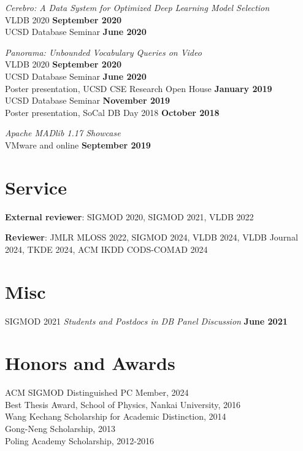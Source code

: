 \documentclass[margin,line]{res}
\begin{document}
\begin{resume}
\vspace{-3mm}
\textit{Cerebro: A Data System for Optimized Deep Learning Model Selection}\\
VLDB 2020 \hfill {\bf September 2020}\\
UCSD Database Seminar \hfill {\bf June 2020}

\vspace{-3mm}
\textit{Panorama: Unbounded Vocabulary Queries on Video}\\
VLDB 2020 \hfill {\bf September 2020}\\
UCSD Database Seminar \hfill {\bf June 2020}\\
Poster presentation, UCSD CSE Research Open House \hfill {\bf January 2019}\\
UCSD Database Seminar \hfill {\bf November 2019}\\
Poster presentation, SoCal DB Day 2018 \hfill {\bf October 2018}

\vspace{-3mm}
\textit{Apache MADlib 1.17 Showcase}\\
VMware and online \hfill {\bf September 2019}\\


\section{\sc Service}

\textbf{External reviewer}: SIGMOD 2020, SIGMOD 2021, VLDB 2022

\textbf{Reviewer}: JMLR MLOSS 2022, SIGMOD 2024, VLDB 2024, VLDB Journal 2024, TKDE 2024, ACM IKDD CODS-COMAD 2024


\section{\sc Misc}

SIGMOD 2021 \textit{Students and Postdocs in DB Panel Discussion} \hfill {\bf June 2021}


\section{\sc Honors and Awards} 
ACM SIGMOD Distinguished PC Member, 2024\\
Best Thesis Award, School of Physics, Nankai University, 2016\\
Wang Kechang Scholarship for Academic Distinction, 2014\\
Gong-Neng Scholarship, 2013\\
Poling Academy Scholarship, 2012-2016



\end{resume}
\end{document}
